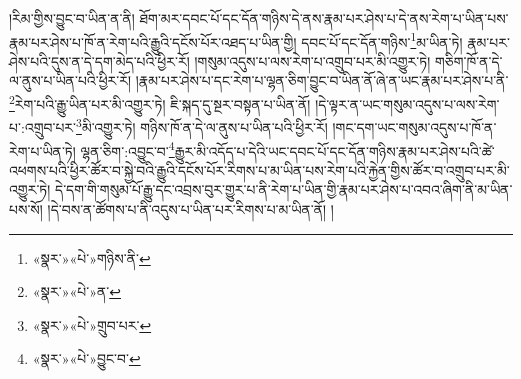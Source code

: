 །རིམ་གྱིས་བྱུང་བ་ཡིན་ན་ནི། ཐོག་མར་དབང་པོ་དང་དོན་གཉིས་དེ་ནས་རྣམ་པར་ཤེས་པ་དེ་ནས་རེག་པ་ཡིན་པས་རྣམ་པར་ཤེས་པ་ཁོ་ན་རེག་པའི་རྒྱུའི་དངོས་པོར་འཐད་པ་ཡིན་གྱི། དབང་པོ་དང་དོན་གཉིས་\footnote{«སྣར་»«པེ་»གཉིས་ནི་}མ་ཡིན་ཏེ། རྣམ་པར་ཤེས་པའི་དུས་ན་དེ་དག་མེད་པའི་ཕྱིར་རོ། །གསུམ་འདུས་པ་ལས་རེག་པ་འགྲུབ་པར་མི་འགྱུར་ཏེ། གཅིག་ཁོ་ན་དེ་ལ་ནུས་པ་ཡིན་པའི་ཕྱིར་རོ། །རྣམ་པར་ཤེས་པ་དང་རེག་པ་ལྷན་ཅིག་བྱུང་བ་ཡིན་ནོ་ཞེ་ན་ཡང་རྣམ་པར་ཤེས་པ་ནི་\footnote{«སྣར་»«པེ་»ན་}རེག་པའི་རྒྱུ་ཡིན་པར་མི་འགྱུར་ཏེ། ཇི་སྐད་དུ་སྔར་བསྟན་པ་ཡིན་ནོ། །དེ་ལྟར་ན་ཡང་གསུམ་འདུས་པ་ལས་རེག་པ་:འགྲུབ་པར་\footnote{«སྣར་»«པེ་»གྲུབ་པར་}མི་འགྱུར་ཏེ། གཉིས་ཁོ་ན་དེ་ལ་ནུས་པ་ཡིན་པའི་ཕྱིར་རོ། །གང་དག་ཡང་གསུམ་འདུས་པ་ཁོ་ན་རེག་པ་ཡིན་ཏེ། ལྷན་ཅིག་:འབྱུང་བ་\footnote{«སྣར་»«པེ་»བྱུང་བ་}རྒྱུར་མི་འདོད་པ་དེའི་ཡང་དབང་པོ་དང་དོན་གཉིས་རྣམ་པར་ཤེས་པའི་ཚེ་འཕགས་པའི་ཕྱིར་ཚོར་བ་སྐྱེ་བའི་རྒྱུའི་དངོས་པོར་རིགས་པ་མ་ཡིན་པས་རེག་པའི་རྐྱེན་གྱིས་ཚོར་བ་འགྲུབ་པར་མི་འགྱུར་ཏེ། དེ་དག་གི་གསུམ་པོ་རྒྱུ་དང་འབྲས་བུར་གྱུར་པ་ནི་རེག་པ་ཡིན་གྱི་རྣམ་པར་ཤེས་པ་འབའ་ཞིག་ནི་མ་ཡིན་པས་སོ། །དེ་བས་ན་ཚོགས་པ་ནི་འདུས་པ་ཡིན་པར་རིགས་པ་མ་ཡིན་ནོ། །
